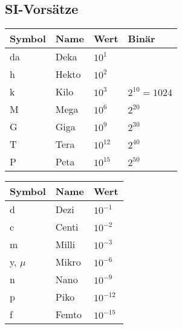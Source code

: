 \subsection{SI-Vorsätze}

\begin{multicols}{2}
\begin{tabular}{|l|l|l|l|}
\hline
\textbf{Symbol}	& \textbf{Name} & \textbf{Wert} & \textbf{Binär} \\
\hline
da	& Deka 	& $10^1$ & \\
\hline
h	& Hekto & $10^2$ & \\ 
\hline
k	& Kilo	& $10^3$ & $2^{10} = 1024$ \\
\hline
M	& Mega	& $10^6$ & $2^{20}$\\
\hline
G	& Giga  & $10^9$ & $2^{30}$\\
\hline
T	& Tera	& $10^{12}$ & $2^{40}$ \\
\hline
P	& Peta	& $10^{15}$ & $2^{50}$\\
\hline
\end{tabular}

\columnbreak

\begin{tabular}{|l|l|l|}
\hline
\textbf{Symbol}	& \textbf{Name} & \textbf{Wert} \\
\hline
d	& Dezi	& $10^{-1}$ \\
\hline
c	& Centi	& $10^{-2}$ \\ 
\hline
m	& Milli	& $10^{-3}$ \\
\hline
y, $\mu$ & Mikro & $10^{-6}$ \\
\hline
n	& Nano	& $10^{-9}$ \\
\hline
p	& Piko	& $10^{-12}$ \\
\hline
f	& Femto & $10^{-15}$ \\
\hline
\end{tabular}
\end{multicols}